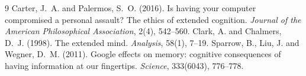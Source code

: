 \documentclass{situationist-preprint}
\begin{document}
\begin{thebibliography}{9}\small
{} Carter, J.~A. and Palermos, S.~O. (2016). Is having your computer compromised a personal assault? The ethics of extended cognition. \emph{Journal of the American Philosophical Association}, 2(4), 542--560.
 Clark, A. and Chalmers, D.~J. (1998). The extended mind. \emph{Analysis}, 58(1), 7--19.
 Sparrow, B., Liu, J. and Wegner, D.~M. (2011). Google effects on memory: cognitive consequences of having information at our fingertips. \emph{Science}, 333(6043), 776--778.
\end{thebibliography}
\end{document}

